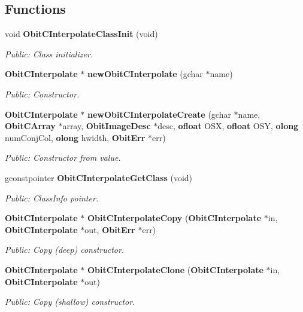 \subsection*{Functions}
\begin{CompactItemize}
\item 
void {\bf Obit\-CInterpolate\-Class\-Init} (void)
\begin{CompactList}\small\item\em Public: Class initializer. \item\end{CompactList}\item 
{\bf Obit\-CInterpolate} $\ast$ {\bf new\-Obit\-CInterpolate} (gchar $\ast$name)
\begin{CompactList}\small\item\em Public: Constructor. \item\end{CompactList}\item 
{\bf Obit\-CInterpolate} $\ast$ {\bf new\-Obit\-CInterpolate\-Create} (gchar $\ast$name, {\bf Obit\-CArray} $\ast$array, {\bf Obit\-Image\-Desc} $\ast$desc, {\bf ofloat} OSX, {\bf ofloat} OSY, {\bf olong} num\-Conj\-Col, {\bf olong} hwidth, {\bf Obit\-Err} $\ast$err)
\begin{CompactList}\small\item\em Public: Constructor from value. \item\end{CompactList}\item 
gconstpointer {\bf Obit\-CInterpolate\-Get\-Class} (void)
\begin{CompactList}\small\item\em Public: Class\-Info pointer. \item\end{CompactList}\item 
{\bf Obit\-CInterpolate} $\ast$ {\bf Obit\-CInterpolate\-Copy} ({\bf Obit\-CInterpolate} $\ast$in, {\bf Obit\-CInterpolate} $\ast$out, {\bf Obit\-Err} $\ast$err)
\begin{CompactList}\small\item\em Public: Copy (deep) constructor. \item\end{CompactList}\item 
{\bf Obit\-CInterpolate} $\ast$ {\bf Obit\-CInterpolate\-Clone} ({\bf Obit\-CInterpolate} $\ast$in, {\bf Obit\-CInterpolate} $\ast$out)
\begin{CompactList}\small\item\em Public: Copy (shallow) constructor. \item\end{CompactList}\item 

\end{CompactItemize}
